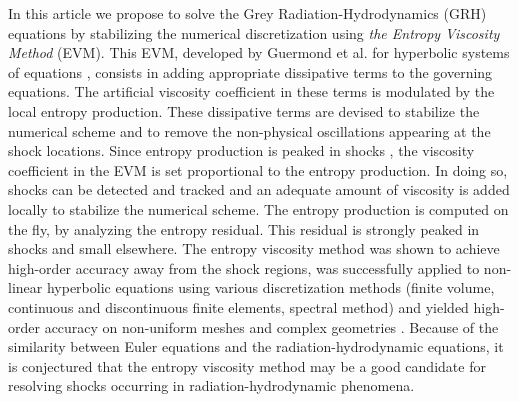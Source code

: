 \documentclass[review]{elsarticle}
\begin{document}
In this article we propose to solve the Grey Radiation-Hydrodynamics (GRH) equations by stabilizing the numerical discretization using \emph{the Entropy Viscosity Method} (EVM). This EVM, developed by Guermond et al. for hyperbolic systems of equations \cite{jlg1, jlg2}, consists in adding appropriate dissipative terms to the governing equations.  The artificial viscosity coefficient in these terms is modulated by the local entropy production. These dissipative terms are devised to stabilize the numerical scheme and to remove the non-physical oscillations appearing at the shock locations. Since entropy production is peaked in shocks \cite{Toro}, the  viscosity coefficient in the EVM is set proportional to the entropy production. In doing so, shocks can be detected and tracked and an adequate amount of viscosity is added locally to stabilize the numerical scheme. The entropy production is computed on the fly, by analyzing the entropy residual. This residual is strongly peaked in shocks and small elsewhere. 
The entropy viscosity method was shown to achieve high-order accuracy away from the shock regions, was successfully applied to non-linear hyperbolic equations using various discretization methods (finite volume, continuous and discontinuous finite elements, spectral method) and yielded high-order accuracy on non-uniform meshes and complex geometries \cite{jlg2, valentin}. Because of the similarity between Euler equations and the radiation-hydrodynamic equations, it is conjectured that the entropy viscosity method may be a good candidate for resolving shocks occurring in radiation-hydrodynamic phenomena.
\end{document}
